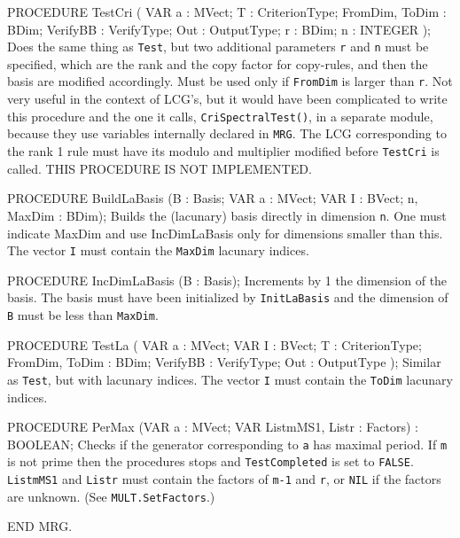 PROCEDURE TestCri
   ( VAR a          : MVect;
     T              : CriterionType;
     FromDim, ToDim : BDim;
     VerifyBB       : VerifyType;
     Out            : OutputType;
     r              : BDim;
     n              : INTEGER );
\endcode
  \tab Does the same thing as {\tt Test}, but two additional parameters
  {\tt r} and {\tt n} must be specified, which are the rank and the copy 
  factor for copy-rules, and then the basis are modified accordingly.
  Must be used only if {\tt FromDim} is larger than {\tt r}. Not very useful
  in the context of LCG's, but it would have been complicated to write
  this procedure and the one it calls, {\tt CriSpectralTest()}, in a
  separate module, because they use variables internally declared in 
  {\tt MRG}. The LCG corresponding to the rank 1 rule must have its
  modulo and multiplier modified before {\tt TestCri} is called.
  THIS PROCEDURE IS NOT IMPLEMENTED. 
  \endtab
\code

PROCEDURE BuildLaBasis
   (B : Basis;   VAR a : MVect;   VAR I : BVect;   n, MaxDim : BDim);
\endcode
 \tab  Builds the (lacunary) basis directly in dimension {\tt n}.
   One must indicate MaxDim and use IncDimLaBasis only for dimensions
   smaller than this.
   The vector {\tt I} must contain the {\tt MaxDim} lacunary indices.
 \endtab
\code

PROCEDURE IncDimLaBasis (B : Basis);
\endcode
  \tab  Increments by 1 the dimension of the basis. The basis
   must have been initialized by {\tt InitLaBasis}
   and the dimension of {\tt B} must be less than {\tt MaxDim}.
  \endtab
\code

PROCEDURE TestLa
   ( VAR a          : MVect;
     VAR I          : BVect;
     T              : CriterionType;
     FromDim, ToDim : BDim;
     VerifyBB       : VerifyType;
     Out            : OutputType );
\endcode
 \tab  Similar as {\tt Test}, but with lacunary indices.
  The vector {\tt I} must contain the {\tt ToDim} lacunary indices.
 \endtab
\code

PROCEDURE PerMax (VAR a : MVect;   VAR ListmMS1, Listr : Factors) : BOOLEAN;
\endcode
  \tab  Checks if the generator corresponding to {\tt a}
    has maximal period. If {\tt m} is not prime then the procedures stops
    and {\tt TestCompleted} is set to {\tt FALSE}.
    {\tt ListmMS1} and {\tt Listr} must contain the factors of
    {\tt m-1} and {\tt r}, or {\tt NIL} if the factors are unknown.
    (See {\tt MULT.SetFactors}.)
   \endtab
\code

END MRG.
\endcode

